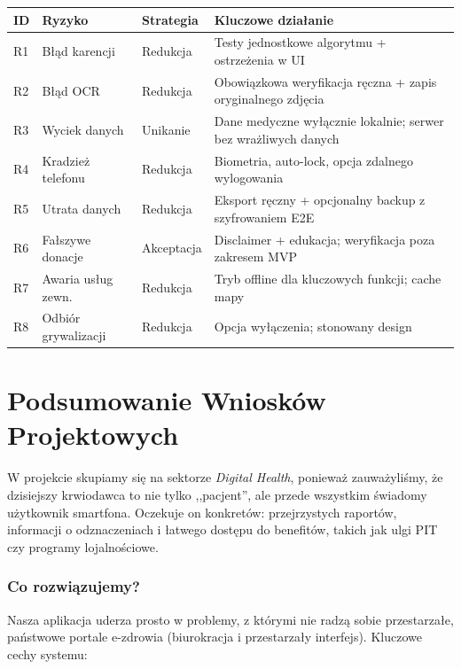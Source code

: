 \documentclass[11pt, a4paper]{article}
\renewcommand{\arraystretch}{1.35}
\begin{document}
\begin{center}
\renewcommand{\arraystretch}{1.4}
\begin{tabularx}{\linewidth}{L{0.4cm} L{3cm} L{3.5cm} X}
  \toprule
  \textbf{ID} & \textbf{Ryzyko} & \textbf{Strategia} & \textbf{Kluczowe działanie} \\
  \midrule
  R1 & Błąd karencji & Redukcja & Testy jednostkowe algorytmu + ostrzeżenia w UI \\
  R2 & Błąd OCR & Redukcja & Obowiązkowa weryfikacja ręczna + zapis oryginalnego zdjęcia \\
  R3 & Wyciek danych & Unikanie & Dane medyczne wyłącznie lokalnie; serwer bez wrażliwych danych \\
  R4 & Kradzież telefonu & Redukcja & Biometria, auto-lock, opcja zdalnego wylogowania \\
  R5 & Utrata danych & Redukcja & Eksport ręczny + opcjonalny backup z szyfrowaniem E2E \\
  R6 & Fałszywe donacje & Akceptacja & Disclaimer + edukacja; weryfikacja poza zakresem MVP \\
  R7 & Awaria usług zewn. & Redukcja & Tryb offline dla kluczowych funkcji; cache mapy \\
  R8 & Odbiór grywalizacji & Redukcja & Opcja wyłączenia; stonowany design \\
  
  \bottomrule
\end{tabularx}
\end{center}
\section{Podsumowanie Wniosków Projektowych}

W projekcie skupiamy się na sektorze \textit{Digital Health}, ponieważ zauważyliśmy,
że dzisiejszy krwiodawca to nie tylko ,,pacjent'', ale przede wszystkim świadomy
użytkownik smartfona. Oczekuje on konkretów: przejrzystych raportów, informacji
o odznaczeniach i łatwego dostępu do benefitów, takich jak ulgi PIT czy
programy lojalnościowe.

\subsubsection*{Co rozwiązujemy?}

Nasza aplikacja uderza prosto w problemy, z którymi nie radzą sobie przestarzałe,
państwowe portale e-zdrowia (biurokracja i przestarzały interfejs). Kluczowe cechy
systemu:
\end{document}
